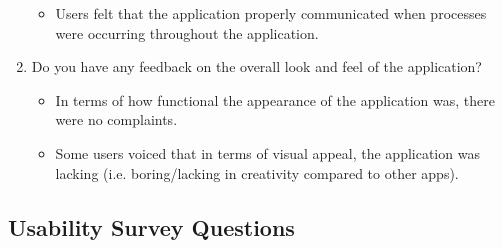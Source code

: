 \documentclass[12pt, titlepage]{article}
\begin{document}
\begin{enumerate}
\begin{itemize}
      \item Users felt that the application properly communicated when processes were occurring throughout
      the application.
    \end{itemize}
  \item Do you have any feedback on the overall look and feel of the application?
    \begin{itemize}
      \item In terms of how functional the appearance of the application was, there were no complaints.
      \item Some users voiced that in terms of visual appeal, the application was lacking (i.e. boring/lacking
      in creativity compared to other apps).
    \end{itemize}
\end{enumerate}

\subsection{Usability Survey Questions}
\end{document}
